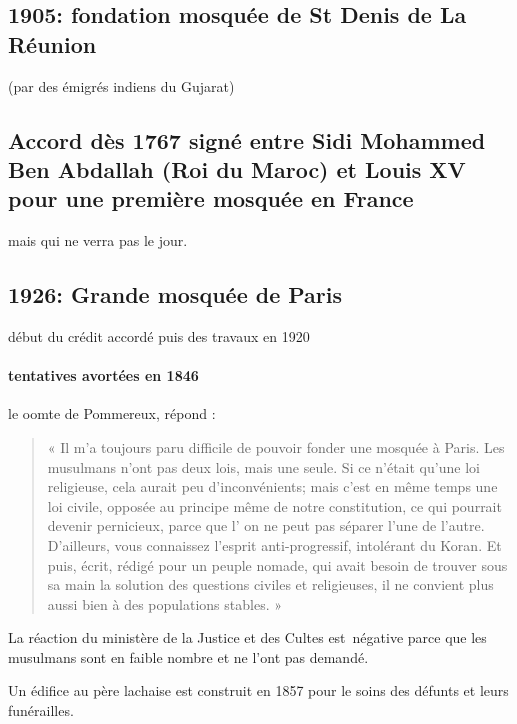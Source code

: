\subsection{1905: fondation mosquée de St Denis de La Réunion}
(par des émigrés indiens du Gujarat)

\subsection{Accord dès 1767 signé entre Sidi Mohammed Ben Abdallah (Roi du Maroc) et Louis XV pour une première mosquée en France}
 mais qui ne verra pas le jour.


\subsection{1926: Grande mosquée de Paris}
début du crédit accordé puis des travaux en 1920

\paragraph{tentatives avortées en 1846}
le oomte de Pommereux, répond : 
\begin{quote}
« Il m'a
toujours paru difficile de pouvoir fonder une mosquée à Paris. Les
musulmans n'ont pas deux lois, mais une seule. Si ce n'était
qu'une loi religieuse, cela aurait peu d'inconvénients; mais c'est
en même temps une loi civile, opposée au principe même de notre
constitution, ce qui pourrait devenir pernicieux, parce que l' on ne
peut pas séparer l'une de l'autre. D'ailleurs, vous connaissez
l'esprit anti-progressif, intolérant du Koran. Et puis, écrit, rédigé
pour un peuple nomade, qui avait besoin de trouver sous sa main
la solution des questions civiles et religieuses, il ne convient plus
aussi bien à des populations stables. »
\end{quote}
La réaction du ministère de la Justice et des Cultes est~négative parce que les musulmans sont en faible nombre et ne l'ont pas demandé.

Un édifice au père lachaise est construit en 1857 pour le soins des défunts et leurs funérailles.

